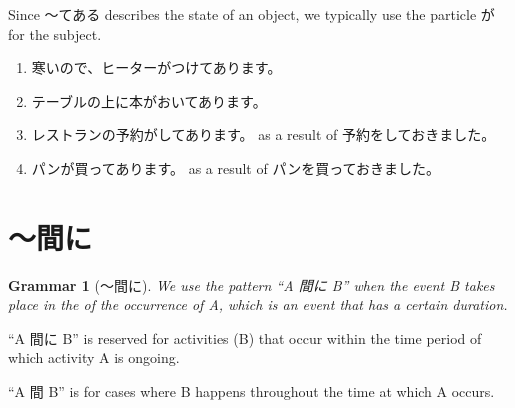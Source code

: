 \documentclass[notoc,notitlepage]{tufte-book}
\newtheorem{grammar}{\faBook Grammar}
\begin{document}
\begin{note}
  Since 〜てある describes the state of an object, we typically use
  the particle が for the subject.
\end{note}

\begin{eg}
  \begin{enumerate}
    \item 寒いので、ヒーターがつけてあります。
    \item テーブルの上に本がおいてあります。
    \item レストランの予約がしてあります。 as a result of
      予約をしておきました。
    \item パンが買ってあります。 as a result of
      パンを買っておきました。
  \end{enumerate}
\end{eg}


\section{〜間に}%
\label{sec:aidani}

\begin{grammar}[〜間に]\label{grammar:_aidani}
  We use the pattern ``A 間に B'' when the event B takes place 
  in the  of the occurrence of A, which is an
  event that has a certain duration.
\end{grammar}

\begin{note}
  ``A 間に B'' is reserved for activities (B) that occur within the time period
  of which activity A is ongoing.
  \begin{marginfigure}
    \centering
    \caption{Rule for 〜間に}\label{fig:rule_for_aidani}
  \end{marginfigure}

  ``A 間 B'' is for cases where B happens throughout the time at which A occurs.
  \begin{marginfigure}
    \centering
    \caption{Rule for 〜間}\label{fig:rule_for_aida}
  \end{marginfigure}
\end{note}
\end{document}
